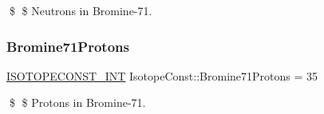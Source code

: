 \$ \$ Neutrons in Bromine-\/71. \mbox{\label{group___isotope_const-_bromine-_br71_gaf3ae19f7e308580e7779bdbdceb994cc}} 
\subsubsection{\texorpdfstring{Bromine71\+Protons}{Bromine71Protons}}
{\footnotesize\ttfamily \mbox{\hyperlink{group___isotope_const-_macros_ga5f18360b3e99483a35c32d789e62621c}{I\+S\+O\+T\+O\+P\+E\+C\+O\+N\+S\+T\+\_\+\+I\+NT}} Isotope\+Const\+::\+Bromine71\+Protons = 35}

\$ \$ Protons in Bromine-\/71. 